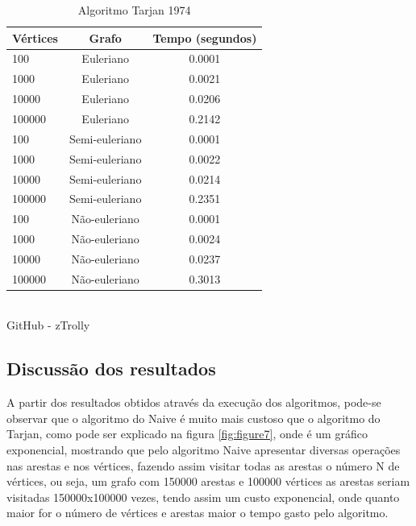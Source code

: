 \newpage
\begin{table}[htb]
	\centering
	\caption{\hspace{0.1cm} Algoritmo Tarjan 1974}
	\vspace{-0.3cm} %
	\label{tab:tabela2}
	\begin{tabular}{l|c|c}
  \hline
    \textbf{Vértices}	& \textbf{Grafo} & \textbf{Tempo (segundos)} \\
    \hline
     100	 & Euleriano      &  0.0001  \\
     1000	 & Euleriano      &  0.0021  \\
     10000	 & Euleriano      &  0.0206  \\
     100000  & Euleriano      &  0.2142  \\
     100	 & Semi-euleriano &  0.0001  \\
     1000	 & Semi-euleriano &  0.0022  \\
     10000	 & Semi-euleriano &  0.0214  \\
     100000  & Semi-euleriano &  0.2351  \\
     100	 & Não-euleriano  &  0.0001  \\
     1000	 & Não-euleriano  &  0.0024  \\
     10000	 & Não-euleriano  &  0.0237  \\
     100000  & Não-euleriano  &  0.3013  \\

     \hline
 \end{tabular}
 	\vspace{.1cm}  %
	\small
	{\footnotesize\\ GitHub - zTrolly}
\end{table}

\subsection{\esp Discussão dos resultados}
A partir dos resultados obtidos através da execução dos algoritmos, pode-se observar que o algoritmo do Naive é muito mais custoso que o algoritmo do Tarjan, como pode ser explicado na figura \ref{fig:figure7}, onde é um gráfico exponencial, mostrando que pelo algoritmo Naive apresentar diversas operações nas arestas e nos vértices, fazendo assim visitar todas as arestas o número N de vértices, ou seja, um grafo com 150000 arestas e 100000 vértices as arestas seriam visitadas 150000x100000 vezes, tendo assim um custo exponencial, onde quanto maior for o número de vértices e arestas maior o tempo gasto pelo algoritmo.

